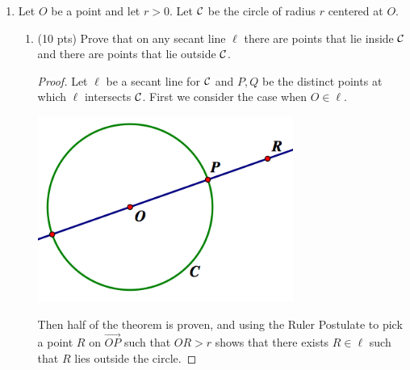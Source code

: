 \documentclass[12pt]{article}
\newcommand{\ray}[1]{\overrightarrow{#1}}
\newcommand{\C}{\cal C}
\begin{document}
\begin{enumerate}
\item Let $O$ be a point and let $r > 0$.  Let $\cal C$ be the circle of radius $r$ centered at $O$. 
\begin{enumerate}
\item (10 pts) Prove that on any secant line $\ell$ there are points that lie inside $\cal C$ and there are points that lie outside $\cal C$. 

\begin{proof} Let $\ell$ be a secant line for $\C$ and $P,Q$ be the distinct points at which $\ell$ intersects $\C$. First we consider the case when $O\in\ell$. 
\begin{center}\includegraphics[width=3.3in]{8a1.png}\end{center}
Then half of the theorem is proven, and using the Ruler Postulate to pick a point $R$ on $\ray{OP}$ such that $OR>r$ shows that there exists $R\in\ell$ such that $R$ lies outside the circle.


\end{proof}
\end{enumerate}
\end{enumerate}
\end{document}
